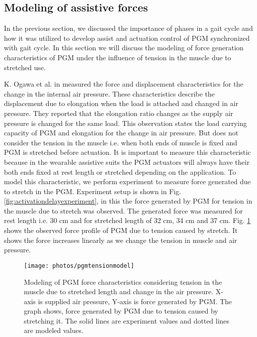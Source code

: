 \documentclass[paper,JRM,paper]{jaciiiarticle}
\begin{document}
\subsection{Modeling of assistive forces}
In the previous section, we discussed the importance of phases in a gait cycle and how it was utilized to develop assist and actuation control of PGM synchronized with gait cycle. In this section we will discuss the modeling of force generation characteristics of PGM under the influence of tension in the muscle due to stretched use. 

K. Ogawa et al. in \cite{13} measured the force and displacement characteristics for the change in the internal air pressure. These characteristics describe the displacement due to elongation when the load is attached and changed in air pressure. They reported that the elongation ratio changes as the supply air pressure is changed for the same load. This observation states the load carrying capacity of PGM and elongation for the change in air pressure. But does not consider the tension in the muscle i.e. when both ends of muscle is fixed and PGM is stretched before actuation. It is important to measure this characteristic because in the wearable assistive suits the PGM actuators will always have their both ends fixed at rest length or stretched depending on the application. To model this characteristic, we perform experiment to measure force generated due to stretch in the PGM. Experiment setup is shown in Fig. \ref{fig:activationdelayexperiment}, in this the force generated by PGM for tension in the muscle due to stretch was observed. The generated force was measured for rest length i.e. 30 cm and for stretched length of 32 cm, 34 cm and 37 cm. Fig. \ref{fig:tensionmodel}  shows the observed force profile of PGM due to tension caused by stretch. It shows the force increases linearly as we change the tension in muscle and air pressure. 



\begin{figure}[h]
	\centering
	\texttt{[image: photos/pgmtensionmodel]}
	\caption{Modeling of PGM force characteristics considering tension in the muscle due to stretched length and change in the air pressure. X-axis is supplied air pressure, Y-axis is force generated by PGM. The graph shows, force generated by PGM due to tension caused by stretching it. The solid lines are experiment values and dotted lines are modeled values.}
	\label{fig:tensionmodel}
\end{figure}
\end{document}
